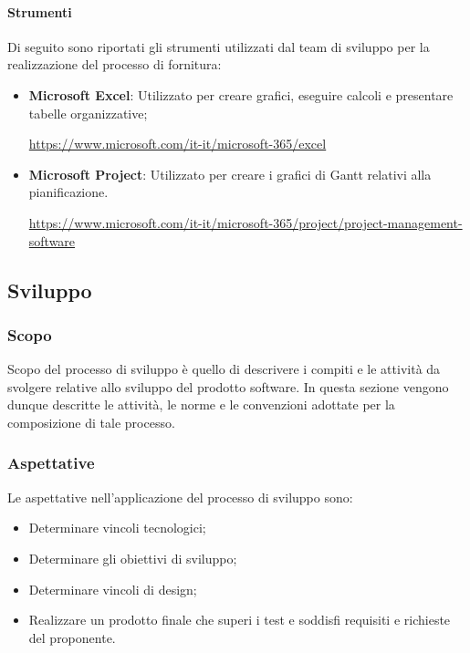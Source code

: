 \paragraph{Strumenti}\label{paragraph: strumenti_fornitura}
Di seguito sono riportati gli strumenti utilizzati dal team di sviluppo per la realizzazione del processo di fornitura:
\begin{itemize}
    \item \textbf{Microsoft Excel}: Utilizzato per creare grafici, eseguire calcoli e presentare tabelle organizzative; 
    \begin{center}
        \url{https://www.microsoft.com/it-it/microsoft-365/excel}
    \end{center}
    \item \textbf{Microsoft Project}: Utilizzato per creare i grafici di Gantt relativi alla pianificazione. 
    \begin{center}
        \url{https://www.microsoft.com/it-it/microsoft-365/project/project-management-software}
    \end{center}
\end{itemize}

\vspace{2cm}

\subsection{Sviluppo} \label{subsection:Sviluppo}
    \subsubsection{Scopo} \label{subsubsection:Sviluppo_Scopo}
    Scopo del processo di sviluppo è quello di descrivere i compiti e le attività da svolgere relative allo sviluppo del prodotto software.
    In questa sezione vengono dunque descritte le attività, le norme e le convenzioni adottate per la composizione di tale processo.

    \subsubsection{Aspettative} \label{subsubsection:Sviluppo_Aspettative}
    Le aspettative nell'applicazione del processo di sviluppo sono:
    \begin{itemize}
        \item Determinare vincoli tecnologici;
        \item Determinare gli obiettivi di sviluppo;
        \item Determinare vincoli di design;
        \item Realizzare un prodotto finale che superi i test e soddisfi requisiti e richieste del proponente.
    \end{itemize}

